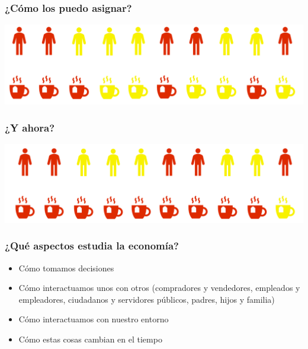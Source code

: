 \documentclass{beamer}
\begin{document}
\begin{frame}
\frametitle{¿Cómo los puedo asignar?}
\begin{center}
    \includegraphics[scale=0.8]{Slides Principios de Economia/Figures/Tazon.png}
\end{center}
\end{frame}

\begin{frame}
\frametitle{¿Y ahora?}
\begin{center}
    \includegraphics[scale=0.6]{Slides Principios de Economia/Figures/Tazon3.png}
\end{center}
\end{frame}

\begin{frame}
\frametitle{¿Qu\'{e} aspectos estudia la economía?}
\begin{itemize}
    \item Cómo tomamos decisiones  \vspace{2mm}
    \item Cómo interactuamos unos con otros (compradores y vendedores, empleados y empleadores, ciudadanos y servidores públicos, padres, hijos y familia) \vspace{2mm}
    \item Cómo interactuamos con nuestro entorno \vspace{2mm}
    \item Cómo estas cosas cambian en el tiempo  
\end{itemize}
\end{frame}
\end{document}
